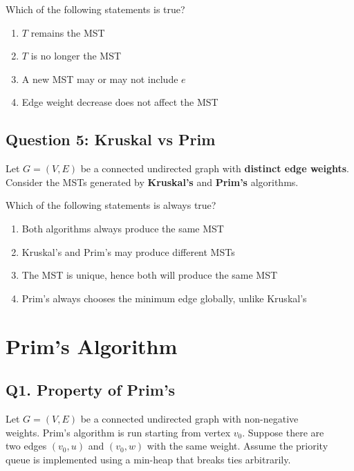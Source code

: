 Which of the following statements is true?
\begin{enumerate}[label=(\alph*)]
    \item $T$ remains the MST
    \item $T$ is no longer the MST
    \item A new MST may or may not include $e$
    \item Edge weight decrease does not affect the MST
\end{enumerate}

\subsection*{Question 5: Kruskal vs Prim}
Let $G = (V, E)$ be a connected undirected graph with \textbf{distinct edge weights}. Consider the MSTs generated by \textbf{Kruskal’s} and \textbf{Prim’s} algorithms.

Which of the following statements is always true?
\begin{enumerate}[label=(\alph*)]
    \item Both algorithms always produce the same MST
    \item Kruskal’s and Prim’s may produce different MSTs
    \item The MST is unique, hence both will produce the same MST
    \item Prim’s always chooses the minimum edge globally, unlike Kruskal’s
\end{enumerate}


\section{Prim's Algorithm}
\subsection*{Q1. Property of Prim's}
Let $G = (V, E)$ be a connected undirected graph with non-negative \\
weights. Prim's algorithm is run starting from vertex $v_0$. Suppose there are \\
two edges $(v_0, u)$ and $(v_0, w)$ with the same weight. Assume the priority \\
queue is implemented using a min-heap that breaks ties arbitrarily.


